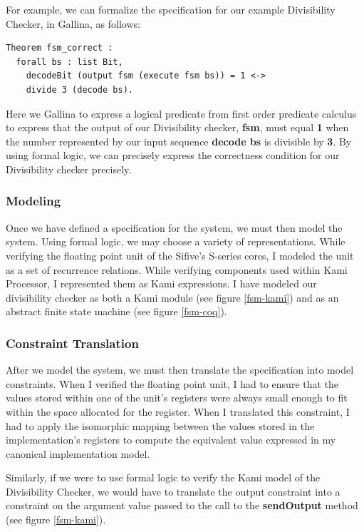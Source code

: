 \documentclass[10pt,a4paper]{article}
\begin{document}
For example, we can formalize the specification for our example Divisibility Checker, in Gallina, as follows:

\begin{verbatim}
Theorem fsm_correct :
  forall bs : list Bit,
    decodeBit (output fsm (execute fsm bs)) = 1 <->
    divide 3 (decode bs).
\end{verbatim}

Here we Gallina to express a logical predicate from first order predicate calculus to express that the output of our Divisibility checker, \textbf{fsm}, must equal \textbf{1} when the number represented by our input sequence \textbf{decode bs} is divisible by \textbf{3}. By using formal logic, we can precisely express the correctness condition for our Divisibility checker precisely.

\subsubsection{Modeling}
Once we have defined a specification for the system, we must then model the system. Using formal logic, we may choose a variety of representations. While verifying the floating point unit of the Sifive’s S-series cores, I modeled the unit as a set of recurrence relations. While verifying components used within Kami Processor, I represented them as Kami expressions. I have modeled our divisibility checker as both a Kami module (see figure \ref{fsm-kami}) and as an abstract finite state machine (see figure \ref{fsm-coq}).

\subsubsection{Constraint Translation}
After we model the system, we must then translate the specification into model constraints. When I verified the floating point unit, I had to ensure that the values stored within one of the unit’s registers were always small enough to fit within the space allocated for the register. When I translated this constraint, I had to apply the isomorphic mapping between the values stored in the implementation’s registers to compute the equivalent value expressed in my canonical implementation model.

Similarly, if we were to use formal logic to verify the Kami model of the Divisibility Checker, we would have to translate the output constraint into a constraint on the argument value passed to the call to the \textbf{sendOutput} method (see figure \ref{fsm-kami}).
\end{document}

